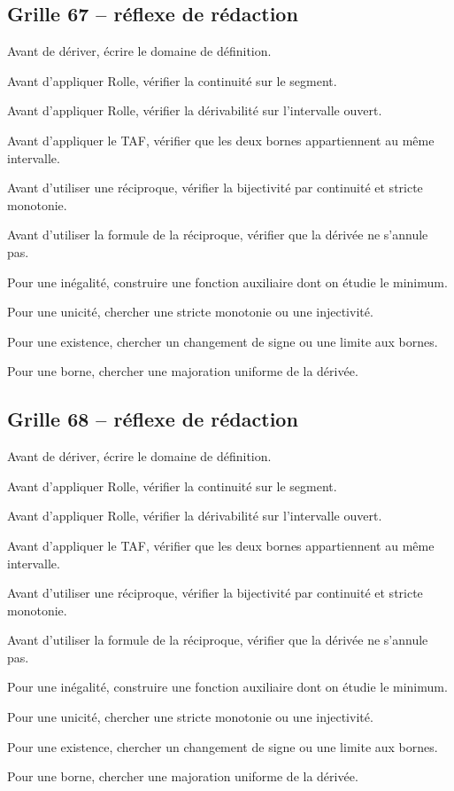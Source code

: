 \documentclass[11pt,a4paper]{article}
\begin{document}
\subsection*{Grille 67 -- réflexe de rédaction}

\begin{methodebox}

Avant de dériver, écrire le domaine de définition.

Avant d'appliquer Rolle, vérifier la continuité sur le segment.

Avant d'appliquer Rolle, vérifier la dérivabilité sur l'intervalle ouvert.

Avant d'appliquer le TAF, vérifier que les deux bornes appartiennent au même intervalle.

Avant d'utiliser une réciproque, vérifier la bijectivité par continuité et stricte monotonie.

Avant d'utiliser la formule de la réciproque, vérifier que la dérivée ne s'annule pas.

Pour une inégalité, construire une fonction auxiliaire dont on étudie le minimum.

Pour une unicité, chercher une stricte monotonie ou une injectivité.

Pour une existence, chercher un changement de signe ou une limite aux bornes.

Pour une borne, chercher une majoration uniforme de la dérivée.

\end{methodebox}

\subsection*{Grille 68 -- réflexe de rédaction}

\begin{methodebox}

Avant de dériver, écrire le domaine de définition.

Avant d'appliquer Rolle, vérifier la continuité sur le segment.

Avant d'appliquer Rolle, vérifier la dérivabilité sur l'intervalle ouvert.

Avant d'appliquer le TAF, vérifier que les deux bornes appartiennent au même intervalle.

Avant d'utiliser une réciproque, vérifier la bijectivité par continuité et stricte monotonie.

Avant d'utiliser la formule de la réciproque, vérifier que la dérivée ne s'annule pas.

Pour une inégalité, construire une fonction auxiliaire dont on étudie le minimum.

Pour une unicité, chercher une stricte monotonie ou une injectivité.

Pour une existence, chercher un changement de signe ou une limite aux bornes.

Pour une borne, chercher une majoration uniforme de la dérivée.

\end{methodebox}
\end{document}

